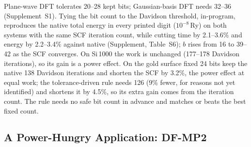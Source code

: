 \documentclass[conference]{IEEEtran}
\newcommand{\Ry}{\,Ry}
\newcommand{\pct}{\%}
\begin{document}
Plane-wave DFT tolerates 20--28 kept bits; Gaussian-basis DFT needs 32--36 (Supplement~S1). Tying the bit count to the
Davidson threshold, in-program, reproduces the native total energy in every printed digit ($10^{-8}$\Ry) on both systems
with the same SCF iteration count, while cutting time by 2.1--3.6\pct{} and energy by 2.2--3.4\pct{} against native (Supplement, Table~S6); $b$ rises from 16 to 39--42 as the SCF converges. On Si\,1000 the work is unchanged
(177--178 Davidson iterations), so its gain is a power effect. On the gold surface fixed 24 bits keep the native 138
Davidson iterations and shorten the SCF by 3.2\pct, the power effect at equal work; the tolerance-driven rule needs 126
(9\pct{} fewer, for reasons not yet identified) and shortens it by 4.5\pct, so its extra gain comes from the iteration
count. The rule needs no safe bit count in advance and matches or beats the best fixed count.

\subsection{A Power-Hungry Application: DF-MP2}\label{sec:mp2}
\end{document}
